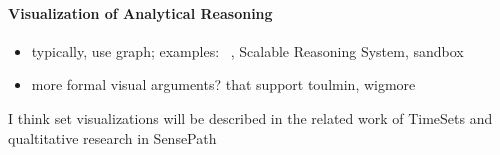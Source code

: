 \paragraph{Visualization of Analytical Reasoning}
\begin{itemize}
	\item typically, use graph; examples: ~\cite{Shrinivasan2008}, Scalable Reasoning System, sandbox
	\item more formal visual arguments? that support toulmin, wigmore
\end{itemize}



I think set visualizations will be described in the related work of TimeSets and qualtitative research in SensePath